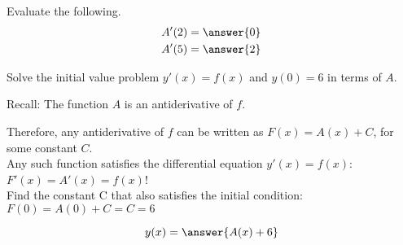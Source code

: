 \documentclass{ximera}
\begin{document}
\begin{exercise}
\begin{image}
\end{image}

Evaluate the following.
\begin{align*}
A'(2) &= \answer{0}\\
A'(5) &= \answer{2}
\end{align*}

Solve the initial value problem $y'(x) = f(x)$ and $y(0) = 6$ in terms of $A$.
\begin{hint}
Recall: The function $A$ is an antiderivative of $f$.
\end{hint}
\begin{hint}
Therefore, any antiderivative of $f$ can be written as $F(x)=A(x)+C$, for some constant $C$.\\

Any such function satisfies the differential equation
 $y'(x) = f(x)$: \\
 $F'(x) = A'(x)=f(x)$!\\
Find the constant C that also satisfies the initial condition:
$F(0)=A(0)+C=C=6$
\end{hint}
\[
y(x) = \answer{A(x)+6}
\]

\end{exercise}
\end{document}

